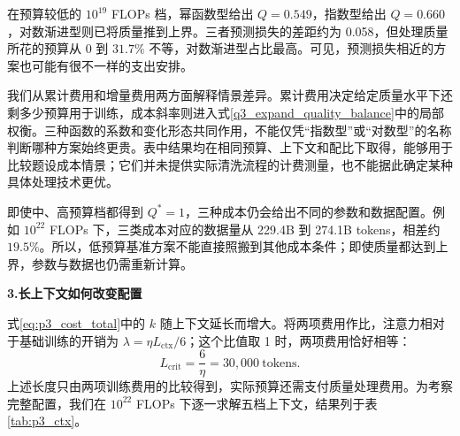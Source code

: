 在预算较低的 $10^{19}$ FLOPs 档，幂函数型给出 $Q=0.549$，指数型给出 $Q=0.660$，对数渐进型则已将质量推到上界。三者预测损失的差距约为 0.058，但处理质量所花的预算从 0 到 $31.7\%$ 不等，对数渐进型占比最高。可见，预测损失相近的方案也可能有很不一样的支出安排。

我们从累计费用和增量费用两方面解释情景差异。累计费用决定给定质量水平下还剩多少预算用于训练，成本斜率则进入式\eqref{q3_expand_quality_balance}中的局部权衡。三种函数的系数和变化形态共同作用，不能仅凭“指数型”或“对数型”的名称判断哪种方案始终更贵。表中结果均在相同预算、上下文和配比下取得，能够用于比较题设成本情景；它们并未提供实际清洗流程的计费测量，也不能据此确定某种具体处理技术更优。

即使中、高预算档都得到 $Q^*=1$，三种成本仍会给出不同的参数和数据配置。例如 $10^{22}$ FLOPs 下，三类成本对应的数据量从 229.4B 到 274.1B tokens，相差约 $19.5\%$。所以，低预算基准方案不能直接照搬到其他成本条件；即使质量都达到上界，参数与数据也仍需重新计算。

\FloatBarrier

\textbf{3.长上下文如何改变配置}\par\nopagebreak[4]
式\eqref{eq:p3_cost_total}中的 $k$ 随上下文延长而增大。将两项费用作比，注意力相对于基础训练的开销为 $\lambda=\eta L_{\mathrm{ctx}}/6$；这个比值取 1 时，两项费用恰好相等：
\begin{equation}
 L_{\mathrm{crit}}=\frac6\eta=30{,}000\ \mathrm{tokens}.
 \label{eq:p3_context}
\end{equation}
上述长度只由两项训练费用的比较得到，实际预算还需支付质量处理费用。为考察完整配置，我们在 $10^{22}$ FLOPs 下逐一求解五档上下文，结果列于表\ref{tab:p3_ctx}。

